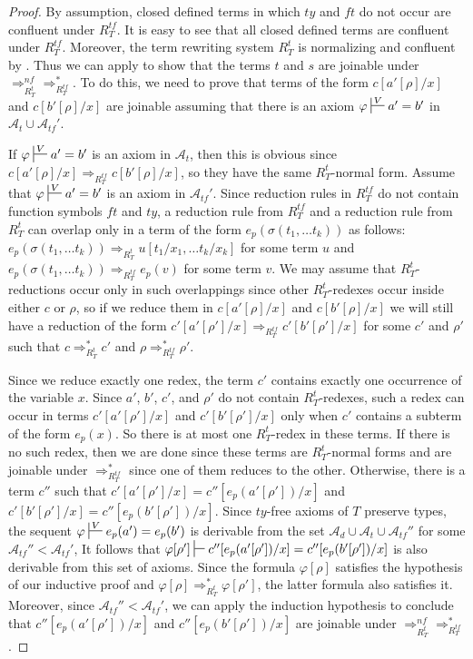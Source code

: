 \documentclass[reqno]{amsart}
\theoremstyle{definition}
\theoremstyle{remark}
\newcommand{\ft}{\mathit{ft}}
\newcommand{\ty}{\mathit{ty}}
\numberwithin{figure}{section}
\begin{document}
\begin{proof}
By assumption, closed defined terms in which $\ty$ and $\ft$ do not occur are confluent under $R^{tf}_T$.
It is easy to see that all closed defined terms are confluent under $R^{tf}_T$.
Moreover, the term rewriting system $R^t_T$ is normalizing and confluent by .
Thus we can apply  to show that the terms $t$ and $s$ are joinable under $\Rightarrow_{R_T^t}^{nf} \Rightarrow_{R_T^{tf}}^*$.
To do this, we need to prove that terms of the form $c[a'[\rho]/x]$ and $c[b'[\rho]/x]$ are joinable assuming that there is an axiom $\varphi \sststile{}{V} a' = b'$ in $\mathcal{A}_t \cup \mathcal{A}_{tf}'$.

If $\varphi \sststile{}{V} a' = b'$ is an axiom in $\mathcal{A}_t$, then this is obvious since $c[a'[\rho]/x] \Rightarrow_{R_T^{tf}} c[b'[\rho]/x]$, so they have the same $R_T^t$-normal form.
Assume that $\varphi \sststile{}{V} a' = b'$ is an axiom in $\mathcal{A}_{tf}'$.
Since reduction rules in $R_T^{tf}$ do not contain function symbols $\ft$ and $\ty$, a reduction rule from $R_T^{tf}$ and a reduction rule from $R_T^t$ can overlap only in a term of the form $e_p(\sigma(t_1, \ldots t_k))$ as follows:
$e_p(\sigma(t_1, \ldots t_k)) \Rightarrow_{R_T^t} u[t_1/x_1, \ldots t_k/x_k]$ for some term $u$ and $e_p(\sigma(t_1, \ldots t_k)) \Rightarrow_{R_T^{tf}} e_p(v)$ for some term $v$.
We may assume that $R_T^t$-reductions occur only in such overlappings since other $R_T^t$-redexes occur inside either $c$ or $\rho$, so if we reduce them in $c[a'[\rho]/x]$ and $c[b'[\rho]/x]$
we will still have a reduction of the form $c'[a'[\rho']/x] \Rightarrow_{R_T^{tf}} c'[b'[\rho']/x]$ for some $c'$ and $\rho'$ such that $c \Rightarrow_{R_T^t}^* c'$ and $\rho \Rightarrow_{R_T^{tf}}^* \rho'$.

Since we reduce exactly one redex, the term $c'$ contains exactly one occurrence of the variable $x$.
Since $a'$, $b'$, $c'$, and $\rho'$ do not contain $R_T^t$-redexes, such a redex can occur in terms $c'[a'[\rho']/x]$ and $c'[b'[\rho']/x]$ only when $c'$ contains a subterm of the form $e_p(x)$.
So there is at most one $R_T^t$-redex in these terms.
If there is no such redex, then we are done since these terms are $R_T^t$-normal forms and are joinable under $\Rightarrow_{R_T^{tf}}^*$ since one of them reduces to the other.
Otherwise, there is a term $c''$ such that $c'[a'[\rho']/x] = c''[e_p(a'[\rho'])/x]$ and $c'[b'[\rho']/x] = c''[e_p(b'[\rho'])/x]$.
Since $\ty$-free axioms of $T$ preserve types, the sequent $\varphi \sststile{}{V} e_p(a') = e_p(b')$ is derivable from the set $\mathcal{A}_d \cup \mathcal{A}_t \cup \mathcal{A}_{tf}''$ for some $\mathcal{A}_{tf}'' < \mathcal{A}_{tf}'$,
It follows that $\varphi[\rho'] \sststile{}{} c''[e_p(a'[\rho'])/x] = c''[e_p(b'[\rho'])/x]$ is also derivable from this set of axioms.
Since the formula $\varphi[\rho]$ satisfies the hypothesis of our inductive proof and $\varphi[\rho] \Rightarrow_{R_T^t}^* \varphi[\rho']$, the latter formula also satisfies it.
Moreover, since $\mathcal{A}_{tf}'' < \mathcal{A}_{tf}'$, we can apply the induction hypothesis to conclude that $c''[e_p(a'[\rho'])/x]$ and $c''[e_p(b'[\rho'])/x]$ are joinable under $\Rightarrow_{R_T^t}^{nf} \Rightarrow_{R_T^{tf}}^*$.
\end{proof}
\end{document}

